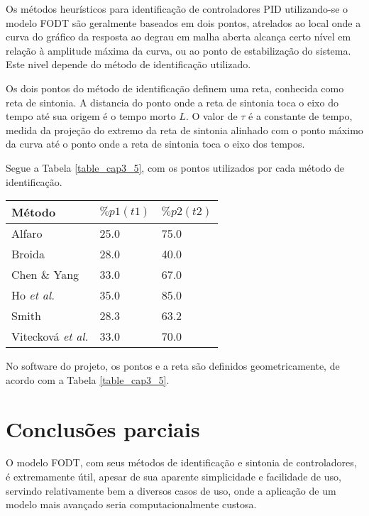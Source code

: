     Os métodos heurísticos para identificação de controladores \acs{PID}
    utilizando-se o modelo \acs{FODT} são geralmente baseados em dois pontos,
    atrelados ao local onde a curva do gráfico da resposta ao degrau em
    malha aberta alcança certo nível em relação à amplitude máxima da curva,
    ou ao ponto de estabilização do sistema. Este nivel depende do método de
    identificação utilizado.
    
    Os dois pontos do método de identificação definem uma reta, conhecida
    como reta de sintonia. A distancia do ponto onde a reta de sintonia
    toca o eixo do tempo até sua origem é o tempo morto $L$. O valor de $\tau$
    é a constante de tempo, medida da projeção do extremo da reta de sintonia
    alinhado com o ponto máximo da curva até o ponto onde a reta de sintonia
    toca o eixo dos tempos.
    
    Segue a Tabela \ref{table_cap3_5}, com os pontos utilizados por cada método de identificação.
    
    \begin{center}
        \begin{tabular}{l l l}
	\label{table_cap3_5}
Método & $\%p1(t1)$ & $\%p2(t2)$ \\
\hline
Alfaro                    & 25.0 & 75.0 \\
Broida                    & 28.0 & 40.0 \\
Chen \& Yang              & 33.0 & 67.0 \\
Ho \textit{et al.}        & 35.0 & 85.0 \\
Smith                     & 28.3 & 63.2 \\
Vitecková \textit{et al.} & 33.0 & 70.0 \\
        \end{tabular}
    \end{center}
    
    No software do projeto, os pontos e a reta são definidos geometricamente,
    de acordo com a Tabela \ref{table_cap3_5}.

\section{Conclusões parciais}

    O modelo \acs{FODT}, com seus métodos de identificação e sintonia de
    controladores, é extremamente útil, apesar de sua aparente simplicidade e
    facilidade de uso, servindo relativamente bem a diversos casos de uso, onde
    a aplicação de um modelo mais avançado seria computacionalmente custosa.
